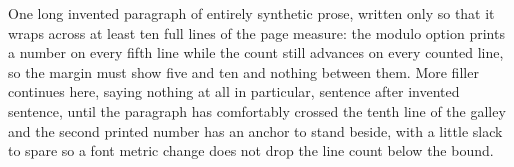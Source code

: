 \documentclass{article}
\begin{document}
One long invented paragraph of entirely synthetic prose, written only so
that it wraps across at least ten full lines of the page measure: the
modulo option prints a number on every fifth line while the count still
advances on every counted line, so the margin must show five and ten and
nothing between them. More filler continues here, saying nothing at all
in particular, sentence after invented sentence, until the paragraph has
comfortably crossed the tenth line of the galley and the second printed
number has an anchor to stand beside, with a little slack to spare so a
font metric change does not drop the line count below the bound.
\end{document}
